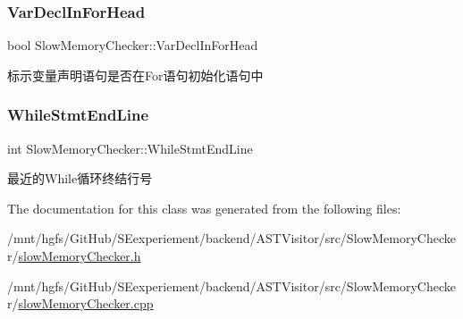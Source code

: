 \subsubsection{\texorpdfstring{Var\+Decl\+In\+For\+Head}{VarDeclInForHead}}
{\footnotesize\ttfamily bool Slow\+Memory\+Checker\+::\+Var\+Decl\+In\+For\+Head}

标示变量声明语句是否在\+For语句初始化语句中 \mbox{\label{classSlowMemoryChecker_a71abe72c12d48e7763aaff2a2af2520d}} 
\subsubsection{\texorpdfstring{While\+Stmt\+End\+Line}{WhileStmtEndLine}}
{\footnotesize\ttfamily int Slow\+Memory\+Checker\+::\+While\+Stmt\+End\+Line}

最近的\+While循环终结行号 

The documentation for this class was generated from the following files\+:\begin{DoxyCompactItemize}
\item 
/mnt/hgfs/\+Git\+Hub/\+S\+Eexperiement/backend/\+A\+S\+T\+Visitor/src/\+Slow\+Memory\+Checker/\hyperlink{slowMemoryChecker_8h}{slow\+Memory\+Checker.\+h}\item 
/mnt/hgfs/\+Git\+Hub/\+S\+Eexperiement/backend/\+A\+S\+T\+Visitor/src/\+Slow\+Memory\+Checker/\hyperlink{slowMemoryChecker_8cpp}{slow\+Memory\+Checker.\+cpp}\end{DoxyCompactItemize}
